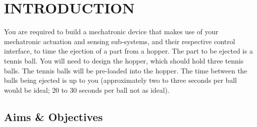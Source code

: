 \documentclass[a4paper, 10pt]{article}
\begin{document}
\setcounter{page}{1}

\section{INTRODUCTION}

You are required to build a mechatronic device that makes use of your mechatronic actuation and sensing sub-systems, and their respective control interface, to time the ejection of a part from a hopper. The part to be ejected is a tennis ball. You will need to design the hopper, which should hold three tennis balls. The tennis balls will be pre-loaded into the hopper. The time between the balls being ejected is up to you (approximately two to three seconds per ball would be ideal; 20 to 30 seconds per ball not as ideal).

%
%
%


\subsection{Aims \& Objectives}
\end{document}
